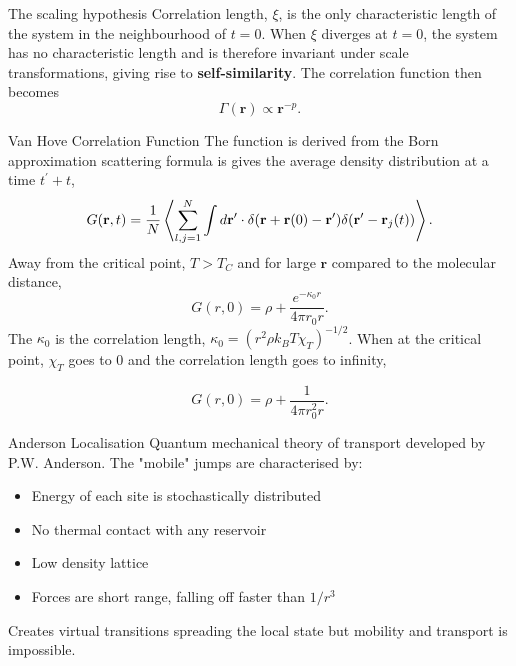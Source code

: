 \documentclass[aspectratio=169]{beamer}
\begin{document}
    \begin{frame}{The scaling hypothesis}
        Correlation length, $\xi$, is the only characteristic length of the system in the neighbourhood of $t=0$. When $\xi$ diverges at $t=0$, the system has no characteristic length and is therefore invariant under scale transformations, giving rise to \textbf{self-similarity}. The correlation function then becomes 
        \begin{equation}
            \Gamma(\mathbf{r}) \propto \mathbf{r}^{-p}.
        \end{equation}
    \end{frame}

    \begin{frame}{Van Hove Correlation Function}
        The function is derived from the Born approximation scattering formula is gives the average density distribution at a time $t^\prime + t$,
        \begin{equation}
            G(\mathbf{r},t)=\frac{1}{N} \Braket{\sum_{l,j=1}^{N}\int d\mathbf{r}^\prime \cdot \delta(\mathbf{r} + \mathbf{r}(0)-\mathbf{r}^\prime)\delta(\mathbf{r}^\prime-\mathbf{r}_j(t))}.
        \end{equation}
        Away from the critical point, $T > T_C$ and for large $\mathbf{r}$ compared to the molecular distance, 
        \begin{equation}
            G(r,0) = \rho + \frac{e^{-\kappa_0 r}}{4\pi r_0 r}.
        \end{equation}
        The $\kappa_0$ is the correlation length, $\kappa_0 = (r^2\rho k_B T \chi_T)^{-1/2}$. When at the critical point, $\chi_T$ goes to 0 and the correlation length goes to infinity,

        \begin{equation}
            G(r,0) = \rho + \frac{1}{4\pi r_0^2 r}.
        \end{equation}
    \end{frame}

    \begin{frame}{Anderson Localisation}
        Quantum mechanical theory of transport developed by P.W. Anderson. The "mobile" jumps are characterised by:
        \begin{itemize}
            \item Energy of each site is stochastically distributed
            \item No thermal contact with any reservoir
            \item Low density lattice
            \item Forces are short range, falling off faster than $1/r^3$
        \end{itemize}
        Creates virtual transitions spreading the local state but mobility and transport is impossible.
    \end{frame}
\end{document}
